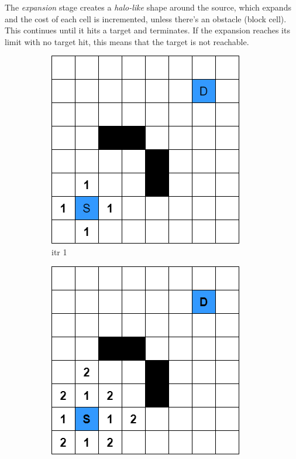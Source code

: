     The \emph{expansion} stage creates a \emph{halo-like} shape around the source, which expands and the cost of each cell is incremented, unless there's an obstacle (block cell). 
    This continues until it hits a target and terminates. If the expansion reaches its limit with no target hit, this means that the target is not reachable.
    
    \begin{figure}
    \label{fig:expansionStage}
    \centering
    \begin{subfigure}[b]{0.3\linewidth}
        \includegraphics[width=\linewidth]{figures/Lee Stages/grid.png}
        \caption{itr 1}
    \end{subfigure}
    \begin{subfigure}[b]{0.3\linewidth}
        \includegraphics[width=\linewidth]{figures/Lee Stages/grid 1.png}

\end{subfigure}
\end{figure}
